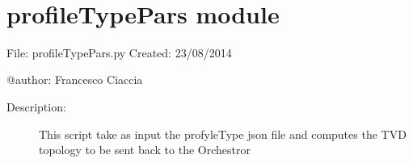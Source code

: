 \documentclass[letterpaper,10pt,oneside]{sphinxmanual}
\begin{document}

\begin{fulllineitems}
\label{mobReport:mobReport.mobReport}~

\begin{fulllineitems}
\label{mobReport:mobReport.mobReport.getStrongestAP}
\end{fulllineitems}


\begin{fulllineitems}
\label{mobReport:mobReport.mobReport.on_put}
\end{fulllineitems}


\begin{fulllineitems}
\label{mobReport:mobReport.mobReport.processReport}
\end{fulllineitems}


\end{fulllineitems}



\chapter{profileTypePars module}
\label{profileTypePars:profiletypepars-module}\label{profileTypePars::doc}\label{profileTypePars:module-profileTypePars}
File:       profileTypePars.py
Created:    23/08/2014

@author:    Francesco Ciaccia
\begin{description}
\item[{Description:}] \leavevmode
This script take as input the profyleType json file and computes the TVD topology to be sent back 
to the Orchestror

\end{description}
\end{document}

